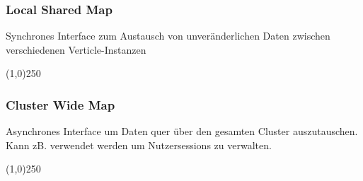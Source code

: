 \documentclass{beamer}
\begin{document}
\begin{frame}
  \frametitle{Local Shared Map}

  Synchrones Interface zum Austausch von unveränderlichen Daten
  zwischen verschiedenen Verticle-Instanzen

  \vspace{.3cm}
  \line(1,0){250}
  \vspace{.3cm}

  
\end{frame}


\begin{frame}
  \frametitle{Cluster Wide Map}
  \vspace{.5cm}

  Asynchrones Interface um Daten quer über den gesamten Cluster auszutauschen.
  Kann zB. verwendet werden um Nutzersessions zu verwalten.

  \vspace{.3cm}
  \line(1,0){250}
  \vspace{.3cm}

  

\end{frame}
\end{document}
